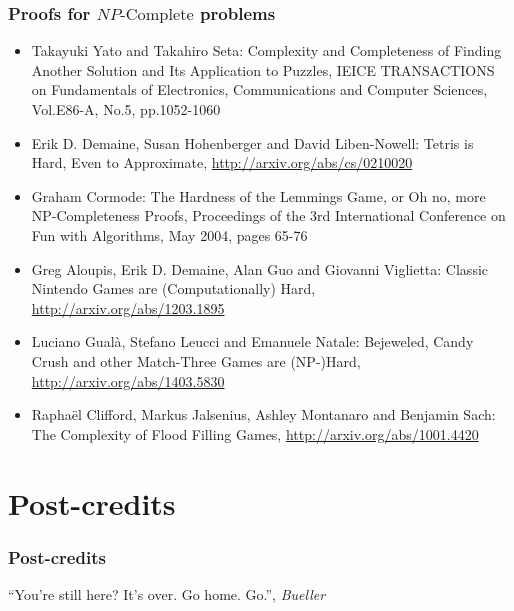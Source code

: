 \documentclass[aspectratio=169]{beamer}
\begin{document}
\begin{frame}
\frametitle{Proofs for $NP\text{-Complete}$ problems}
\begin{itemize}
    \item Takayuki Yato and Takahiro Seta: Complexity and Completeness of Finding Another Solution and Its Application to Puzzles, IEICE TRANSACTIONS on Fundamentals of Electronics, Communications and Computer Sciences, Vol.E86-A, No.5, pp.1052-1060
    \item  Erik D. Demaine, Susan Hohenberger and David Liben-Nowell: Tetris is Hard, Even to Approximate, \url{http://arxiv.org/abs/cs/0210020}
    \item Graham Cormode: The Hardness of the Lemmings Game, or Oh no, more NP-Completeness Proofs, Proceedings of the 3rd International Conference on Fun with Algorithms, May 2004, pages 65-76
    \item Greg Aloupis, Erik D. Demaine, Alan Guo and Giovanni Viglietta: Classic Nintendo Games are (Computationally) Hard, \url{http://arxiv.org/abs/1203.1895}
    \item Luciano Gualà, Stefano Leucci and Emanuele Natale: Bejeweled, Candy Crush and other Match-Three Games are (NP-)Hard, \url{http://arxiv.org/abs/1403.5830}
    \item Rapha\"{e}l Clifford, Markus Jalsenius, Ashley Montanaro and Benjamin Sach:  The Complexity of Flood Filling Games, \url{http://arxiv.org/abs/1001.4420}
\end{itemize}
\end{frame}

\section{Post-credits}

\begin{frame}
\frametitle{Post-credits}
\centerline{``You're still here? It's over. Go home. Go.'', {\em Bueller}}
\end{frame}

\end{document}
